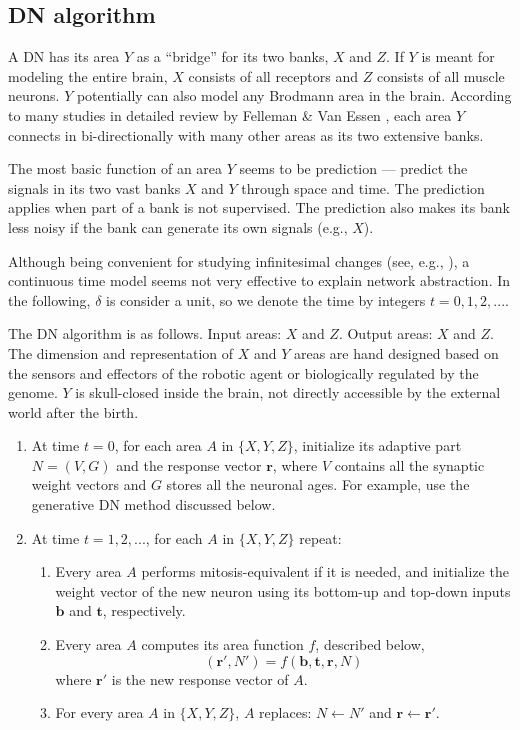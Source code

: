 \documentclass[conference]{IEEEtran}
\def\b{\mathbf b}
\def\r{\mathbf r}
\def\t{\mathbf t}
\begin{document}
\subsection{DN algorithm}
A DN has its area $Y$ as a ``bridge'' for its two banks, $X$ and $Z$.
If $Y$ is meant for modeling the entire brain, $X$ consists of all receptors and $Z$ consists of all muscle 
neurons.   $Y$ potentially can also model any Brodmann area in the brain.   According to 
many studies in detailed review
by Felleman \& Van Essen \cite{FellemanVanEssen91}, each area $Y$ connects in bi-directionally with many other
areas as its two extensive banks.  

The most basic function of an area $Y$ seems to be prediction --- predict the signals in its two vast banks $X$ and $Y$ through
space and time.   The prediction applies when part of a bank is not supervised. 
The prediction also makes its bank less noisy if the bank can generate its own signals (e.g., $X$).    

Although being convenient for studying infinitesimal changes (see, e.g., \cite{Izhikevich07}), a continuous time model  seems not very effective to explain network abstraction.   In the following, $\delta$ is consider a unit, so we denote the time by integers $t=0, 1, 2, ...$.  

The DN algorithm is as follows.  
Input areas: $X$ and $Z$.  Output areas: $X$ and $Z$.   The dimension and representation of $X$ and $Y$ areas are hand designed based on the sensors and effectors of the robotic agent or biologically regulated by the genome.   
$Y$ is skull-closed inside the brain, not directly accessible  by the external world after the birth.     
\begin{enumerate}
\item At time $t=0$, for each area $A$ in $\{X, Y, Z\}$, initialize 
its adaptive part $N=(V, G)$ and the response vector $\r$, where $V$ contains all the synaptic weight vectors and $G$ stores all the neuronal ages.   For example, use the generative DN method discussed below. 
\item At time $t=1, 2, ... $, for each $A$ in $\{X, Y, Z\}$ repeat: 
\begin{enumerate}
\item Every area $A$ performs mitosis-equivalent if it is needed, and initialize the weight vector of the new neuron using its bottom-up and top-down inputs $\b$ and $\t$, respectively.
\item Every area $A$ computes its area function $f$, described below, 
\begin{equation}
(\r', N') = f(\b, \t, \r, N)
\end{equation}
where $\r'$ is the new response vector of $A$.  
\item For every area $A$ in $\{X, Y, Z\}$, $A$ replaces: $N\leftarrow N'$ and $\r \leftarrow \r'$.
\end{enumerate}
\end{enumerate}
\end{document}
